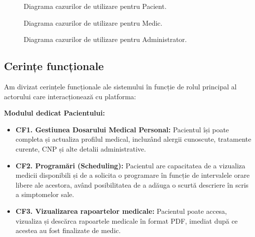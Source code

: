 \begin{figure}[H]
    \centering
    \color{red}
    \caption{Diagrama cazurilor de utilizare pentru Pacient.}
    \label{fig:use_case_patient}
\end{figure}

\begin{figure}[H]
    \centering
    \color{red}
    \caption{Diagrama cazurilor de utilizare pentru Medic.}
    \label{fig:use_case_doctor}
\end{figure}

\begin{figure}[H]
    \centering
    \color{red}
    \caption{Diagrama cazurilor de utilizare pentru Administrator.}
    \label{fig:use_case_admin}
\end{figure}

\subsection{Cerințe funcționale}
Am divizat cerințele funcționale ale sistemului în funcție de rolul principal al actorului care interacționează cu platforma:

\textbf{Modulul dedicat Pacientului:}
\begin{itemize}
    \item \textbf{CF1. Gestiunea Dosarului Medical Personal:} Pacientul își poate completa și actualiza profilul medical, incluzând alergii cunoscute, tratamente curente, CNP și alte detalii administrative.
    \item \textbf{CF2. Programări (Scheduling):} Pacientul are capacitatea de a vizualiza medicii disponibili și de a solicita o programare în funcție de intervalele orare libere ale acestora, având posibilitatea de a adăuga o scurtă descriere în scris a simptomelor sale.
    \item \textbf{CF3. Vizualizarea rapoartelor medicale:} Pacientul poate accesa, vizualiza și descărca rapoartele medicale în format PDF, imediat după ce acestea au fost finalizate de medic.
\end{itemize}

